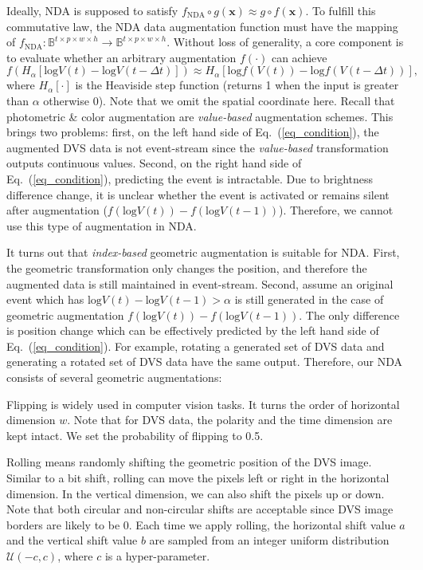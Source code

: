 \documentclass[runningheads]{llncs}
\newcommand{\bftab}{\fontseries{b}\selectfont}
\begin{document}
Ideally, NDA is supposed to satisfy $f_{\text{NDA}}\circ g(\bm{x})\approx g\circ f(\bm{x})$. To fulfill this commutative law, the NDA data augmentation function must have the mapping of $f_{\text{NDA}}:\mathbb{B}^{t\times p\times w\times h} \rightarrow \mathbb{B}^{t\times p\times w\times h}$.
Without loss of generality, a core component is to evaluate whether an arbitrary augmentation $f(\cdot)$ can achieve 
\begin{equation}
    f(H_\alpha\left[\mathrm{log}V(t) - \mathrm{log}V(t-\Delta t)\right]) \approx H_\alpha\left[ \mathrm{log}f(V(t)) - \mathrm{log}f(V(t-\Delta t))\right],
    \label{eq_condition}
\end{equation}
where $H_\alpha[\cdot]$ is the Heaviside step function (\ie returns 1 when the input is greater than $\alpha$ otherwise 0). Note that we omit the spatial coordinate here.
Recall that photometric \& color augmentation are \textit{value-based} augmentation schemes. This brings two problems: first, on the left hand side of Eq.~(\ref{eq_condition}), the augmented DVS data is not event-stream since the \textit{value-based} transformation outputs continuous values. Second, on the right hand side of Eq.~(\ref{eq_condition}), predicting the event is intractable. Due to brightness difference change, it is unclear whether the event is activated or remains silent after augmentation ($f(\mathrm{log}V(t)) - f(\mathrm{log}V(t-1))$).  
Therefore, we cannot use this type of augmentation in NDA.

It turns out that \textit{index-based} geometric augmentation is suitable for NDA. First, the geometric transformation only changes the position, and therefore the augmented data is still maintained in event-stream. Second, assume an original event which has $\mathrm{log}V(t) - \mathrm{log}V(t-1) > \alpha$ is still generated in the case of geometric augmentation $f(\mathrm{log}V(t)) - f(\mathrm{log}V(t-1))$. The only difference is position change which can be effectively predicted by the left hand side of Eq.~(\ref{eq_condition}).
For example, rotating a generated set of DVS data and generating a rotated set of DVS data have the same output. 
Therefore, our NDA consists of several geometric augmentations:

\noindent{\bftab Horizontal Flipping.} Flipping is widely used in computer vision tasks. It turns the order of horizontal dimension $w$. Note that for DVS data, the polarity and the time dimension are kept intact. We set the probability of flipping to 0.5. 

\noindent{\bftab Rolling.} Rolling means randomly shifting the geometric position of the DVS image. Similar to a bit shift, rolling can move the pixels left or right in the horizontal dimension. In the vertical dimension, we can also shift the pixels up or down. Note that both circular and non-circular shifts are acceptable since DVS image borders are likely to be 0. Each time we apply rolling, the horizontal shift value $a$ and the vertical shift value $b$ are sampled from an integer uniform distribution $\mathcal{U}(-c,c)$, where $c$ is a hyper-parameter.
\end{document}
